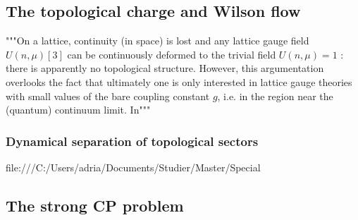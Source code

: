 \documentclass[a4paper,10pt]{article}
\begin{document}
\subsection{The topological charge and Wilson flow}
"""On a lattice, continuity (in space) is lost and any lattice gauge field $U(n, \mu)[3]$ can be continuously deformed to the trivial field $U(n, \mu)=1$ : there is apparently no topological structure. However, this argumentation overlooks the fact that ultimately one is only interested in lattice gauge theories with small values of the bare coupling constant $g$, i.e. in the region near the (quantum) continuum limit. In"""
\subsubsection{Dynamical separation of topological sectors}
file:///C:/Users/adria/Documents/Studier/Master/Special%

\begin{figure}[H]
\centering
{}
\caption[]{}\label{fig:topologicalSectors_illustration}
\end{figure}
\subsection{The strong CP problem}
\end{document}
